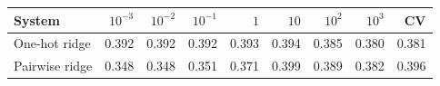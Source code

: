 \begin{tabular}{lrrrrrrrr}
\toprule
System & $10^{-3}$ & $10^{-2}$ & $10^{-1}$ & $1$ & $10$ & $10^2$ & $10^3$ & CV \\
\midrule
One-hot ridge & 0.392 & 0.392 & 0.392 & 0.393 & 0.394 & 0.385 & 0.380 & 0.381 \\
Pairwise ridge & 0.348 & 0.348 & 0.351 & 0.371 & 0.399 & 0.389 & 0.382 & 0.396 \\
\bottomrule
\end{tabular}
